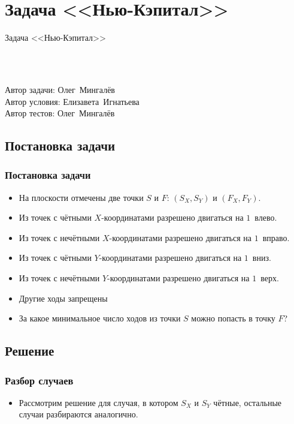 \section{Задача <<Нью-Кэпитал>>}


\begin{frame}
    \begin{center}
        \Huge Задача <<Нью-Кэпитал>>
    \end{center}
    ~\\~\\
    \begin{center}
        Автор задачи: Олег~Мингалёв\\
        Автор условия: Елизавета~Игнатьева\\
        Автор тестов: Олег~Мингалёв
    \end{center}
\end{frame}

\subsection{Постановка задачи}

\begin{frame}
    \frametitle{Постановка задачи}

    \begin{itemize}
        \item На плоскости отмечены две точки $S$ и $F$: $(S_X, S_Y)$ и $(F_X, F_Y)$.
        \item Из точек с чётными $X$-координатами разрешено двигаться на $1$~влево.
        \item Из точек с нечётными $X$-координатами разрешено двигаться на $1$~вправо.
        \item Из точек с чётными $Y$-координатами разрешено двигаться на $1$~вниз.
        \item Из точек с нечётными $Y$-координатами разрешено двигаться на $1$~верх.
        \item Другие ходы запрещены
        \item За какое минимальное число ходов из точки $S$ можно попасть в точку $F$?
    \end{itemize}
\end{frame}

\subsection{Решение}

\begin{frame}
    \frametitle{Разбор случаев}

    \begin{itemize}
        \item Рассмотрим решение для случая, в котором $S_X$ и $S_Y$ чётные, остальные случаи разбираются аналогично.
    \end{itemize}
\end{frame}

